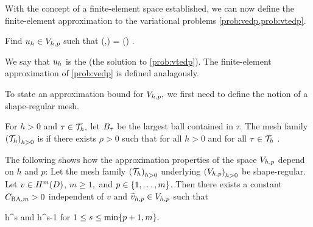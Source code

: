 

    With the concept of a finite-element space established, we can now define the finite-element approximation to the variational problems \cref{prob:vedp,prob:vtedp}.

    \label{prob:fevtedp}
    Find $u_{h} \in V_{h,p}$ such that
    \beq\label{eq:fevtedp}
    \aT(\uh,\vh) = \LT(\vh) \tforall \vh \in \Vhp.
    \eeq
    \eprob

    We say that $u_{h}$ is the  (the solution to \cref{prob:vtedp}). The finite-element approximation of \cref{prob:vedp} is defined analagously.
    
    To state an approximation bound for $V_{h,p},$ we first need to define the notion of a shape-regular mesh.

    For $h>0$ and $\tau \in \mathcal T_{h},$ let $B_{\tau}$ be the largest ball contained in $\tau.$ The mesh family $\mleft(\Th\mright)_{h>0}$ is  if there exists $\rho > 0$ such that for all $h>0$ and for all $\tau \in \mathcal T_{h}$
    \beqs
\diam \Btau \geq \rho \diam \tau.
    \eeqs
    \ede

    The following  shows how the approximation properties of the space $V_{h,p}$ depend on $h$ and $p$:
    \label{lem:scottzhang}
    Let the mesh family $\mleft(\Th\mright)_{h>0}$ underlying $\mleft(\Vhp\mright)_{h>0}$ be shape-regular. Let $v \in \HmD$, $m \geq 1,$ and $p \in \set{1,\ldots,m}$. Then there exists a constant $C_{\mathrm{BA},m}>0$ independent of $v$ and $\widetilde{v}_{h,p} \in V_{h,p}$ such that

    \beqs
{} \leq \CSZm h^s 
    \eeqs
     and
    \beqs
{} \leq \CSZm h^{s-1} 
\eeqs
for $1 \leq s \leq \min\set{p+1,m}.$
    \ele

